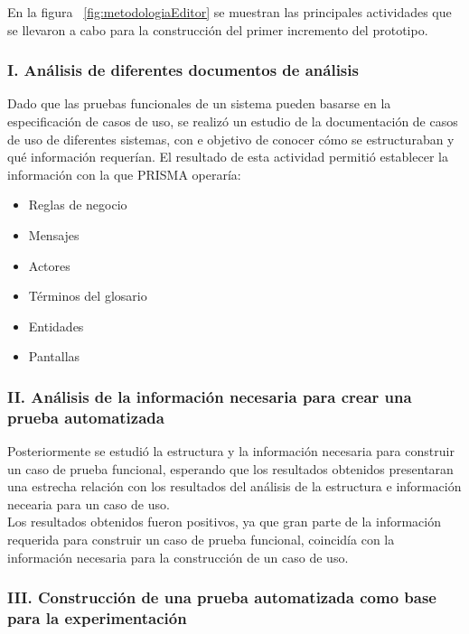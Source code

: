	En la figura ~\ref{fig:metodologiaEditor} se muestran las principales actividades que se llevaron a cabo para la construcción del primer incremento del prototipo.
	
	
\subsubsection{I. Análisis de diferentes documentos de análisis}
	Dado que las pruebas funcionales de un sistema pueden basarse en la especificación de casos de uso, se realizó un estudio de la documentación de casos de uso de diferentes sistemas, con e objetivo de conocer cómo se estructuraban y qué información requerían. El resultado de esta actividad permitió establecer la información con la que PRISMA operaría:
	\begin{itemize}
		\item Reglas de negocio
		\item Mensajes
		\item Actores
		\item Términos del glosario
		\item Entidades
		\item Pantallas
	\end{itemize}
	
\subsubsection{II. Análisis de la información necesaria para crear una prueba automatizada}
		
	Posteriormente se estudió la estructura y la información necesaria para construir un caso de prueba funcional, esperando que los resultados obtenidos presentaran una estrecha relación con los resultados del análisis de la estructura e información necearia para un caso de uso.\\
		
	Los resultados obtenidos fueron positivos, ya que gran parte de la información requerida para construir un caso de prueba funcional, coincidía con la información necesaria para la construcción de un caso de uso.


\subsubsection{III. Construcción de una prueba automatizada como base para la experimentación}

